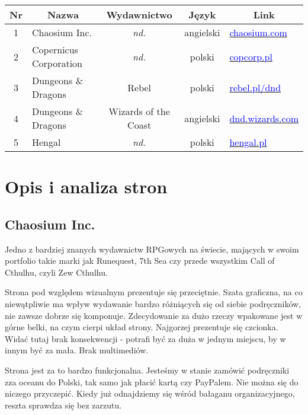 \documentclass[a4paper,11pt]{article}
\begin{document}
\begin{tabular}{|c|l|c|c|l|}
	\hline
	\multicolumn{1}{|c}{\textbf{Nr}} & \multicolumn{1}{|c}{\textbf{Nazwa}} & \multicolumn{1}{|c}{\textbf{Wydawnictwo}} &\multicolumn{1}{|c}{\textbf{Język}} &\multicolumn{1}{|c|}{\textbf{Link}}\\
	\hline
	\hline
	1 & Chaosium Inc. & \textit{nd.} & angielski & \href{https://www.chaosium.com}{\textcolor{blue}{chaosium.com}} \\
	\hline
	2 & Copernicus Corporation & \textit{nd.} & polski & \href{https://copcorp.pl}{\textcolor{blue}{copcorp.pl}} \\
	\hline
	3 & Dungeons \& Dragons & Rebel & polski & \href{https://www.rebel.pl/dnd/}{\textcolor{blue}{rebel.pl/dnd}} \\
	\hline
	4 & Dungeons \& Dragons & Wizards of the Coast & angielski & \href{https://dnd.wizards.com}{\textcolor{blue}{dnd.wizards.com}} \\
	\hline
	5 & Hengal & \textit{nd.} & polski & \href{https://hengal.pl}{\textcolor{blue}{hengal.pl}} \\
	\hline
\end{tabular}


\section {Opis i analiza stron}

\subsection {Chaosium Inc.}

Jedno z bardziej znanych wydawnictw RPGowych na świecie, mających w swoim portfolio takie marki jak Runequest, 7th Sea czy przede wszystkim Call of Cthulhu, czyli Zew Cthulhu. 

Strona pod względem wizualnym prezentuje się przeciętnie. Szata graficzna, na co niewątpliwie ma wpływ wydawanie bardzo różniących się od siebie podręczników, nie zawsze dobrze się komponuje. Zdecydowanie za dużo rzeczy wpakowane jest w górne belki, na czym cierpi układ strony. Najgorzej prezentuje się czcionka. Widać tutaj brak konsekwencji - potrafi być za duża w jednym miejscu, by w innym być za mała. Brak multimediów.

Strona jest za to bardzo funkcjonalna. Jesteśmy w stanie zamówić podręczniki zza oceanu do Polski, tak samo jak płacić kartą czy PayPalem. Nie można się do niczego przyczepić. Kiedy już odnajdziemy się wśród bałaganu organizacyjnego, reszta sprawdza się bez zarzutu.
\end{document}
